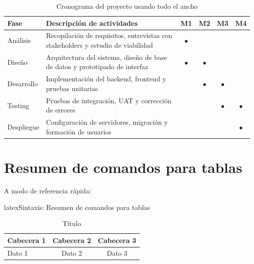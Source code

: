 \begin{table}[htbp]
  \centering
  \caption{Cronograma del proyecto usando todo el ancho}
  \label{tab:cronograma}
  \EPScabeceraTabla
  \begin{tabularx}{\textwidth}{@{}lXcccc@{}}
    \toprule
    \textbf{Fase} & \textbf{Descripción de actividades} & \textbf{M1} & \textbf{M2} & \textbf{M3} & \textbf{M4} \\
    \midrule
    Análisis & Recopilación de requisitos, entrevistas con stakeholders y estudio de viabilidad & $\bullet$ & & & \\
    Diseño & Arquitectura del sistema, diseño de base de datos y prototipado de interfaz & $\bullet$ & $\bullet$ & & \\
    Desarrollo & Implementación del backend, frontend y pruebas unitarias & & $\bullet$ & $\bullet$ & \\
    Testing & Pruebas de integración, UAT y corrección de errores & & & $\bullet$ & $\bullet$ \\
    Despliegue & Configuración de servidores, migración y formación de usuarios & & & & $\bullet$ \\
    \bottomrule
  \end{tabularx}
\end{table}

\section{Resumen de comandos para tablas}
\label{sec:resumen-comandos-tablas}

A modo de referencia rápida:

\begin{codigosimple}{latex}{Sintaxis: Resumen de comandos para tablas}
\begin{table}[htbp]
  \centering
  \caption{Título}
  \label{tab:etiqueta}
  \begin{tabular}{@{}lcc@{}}
    \toprule
    Cabecera 1 & Cabecera 2 & Cabecera 3 \\
    \midrule
    Dato 1 & Dato 2 & Dato 3 \\
    \bottomrule
  \end{tabular}
\end{table}

\toprule      %
\midrule      %
\bottomrule   %


\end{codigosimple}

